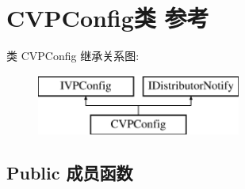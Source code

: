 \hypertarget{class_c_v_p_config}{}\section{C\+V\+P\+Config类 参考}
\label{class_c_v_p_config}
类 C\+V\+P\+Config 继承关系图\+:\begin{figure}[H]
\begin{center}
\leavevmode
\includegraphics[height=2.000000cm]{class_c_v_p_config}
\end{center}
\end{figure}
\subsection*{Public 成员函数}
